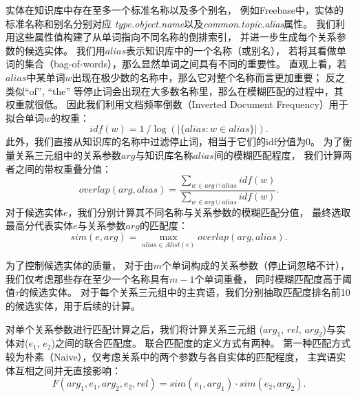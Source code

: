 实体在知识库中存在至多一个标准名称以及多个别名，
例如Freebase中，实体的标准名称和别名分别对应
\textit{type.object.name}以及\textit{common.topic.alias}属性。
我们利用这些属性值构建了从单词指向不同名称的倒排索引，
并进一步生成每个关系参数的候选实体。
我们用$alias$表示知识库中的一个名称（或别名），
若将其看做单词的集合（bag-of-words），那么显然单词之间具有不同的重要性。
直观上看，若$alias$中某单词$w$出现在极少数的名称中，那么它对整个名称而言更加重要；
反之类似``of'', ``the'' 等停止词会出现在大多数名称里，那么在模糊匹配的过程中，其权重就很低。
因此我们利用文档频率倒数（Inverted Document Frequency）用于拟合单词$w$的权重：
\begin{equation}
idf(w)=1\ /\log(|\{alias : w \in alias\}|).
\end{equation}
此外，我们直接从知识库的名称中过滤停止词，相当于它们的idf分值为0。
为了衡量关系三元组中的关系参数$arg$与知识库名称$alias$间的模糊匹配程度，
我们计算两者之间的带权重叠分值：
\begin{equation}
overlap(arg, alias) = \frac {\sum\limits_{w \in arg \cap alias} idf(w)} {\sum\limits_{w \in arg \cup alias} idf(w)}.
\end{equation}
对于候选实体$e$，我们分别计算其不同名称与关系参数的模糊匹配分值，
最终选取最高分代表实体$e$与关系参数$arg$的匹配度：
\begin{equation}
sim(e, arg) = \max\limits_{alias \in Alist(e)} overlap(arg, alias).
\end{equation}


为了控制候选实体的质量，
对于由$m$个单词构成的关系参数（停止词忽略不计），
我们仅考虑那些存在至少一个名称具有$m-1$个单词重叠，
同时模糊匹配度高于阈值$\tau$的候选实体。
对于每个关系三元组中的主宾语，我们分别抽取匹配度排名前10的候选实体，用于后续的计算。

对单个关系参数进行匹配计算之后，我们将计算关系三元组
($arg_1$, $rel$, $arg_2$)与实体对($e_1$, $e_2$)之间的联合匹配度。
联合匹配度的定义方式有两种。
第一种匹配方式较为朴素（Naive），仅考虑关系中的两个参数与各自实体的匹配程度，
主宾语实体互相之间并无直接影响：
\begin{equation}
    \label{eqn:naive}
    F(arg_1, e_1, arg_2, e_2, rel) = sim(e_1, arg_1) \cdot sim(e_2, arg_2).
\end{equation}

